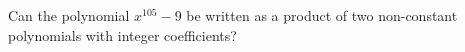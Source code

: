 Can the polynomial $x^{105} - 9$ be written as a product of two non-constant polynomials with integer coefficients?
